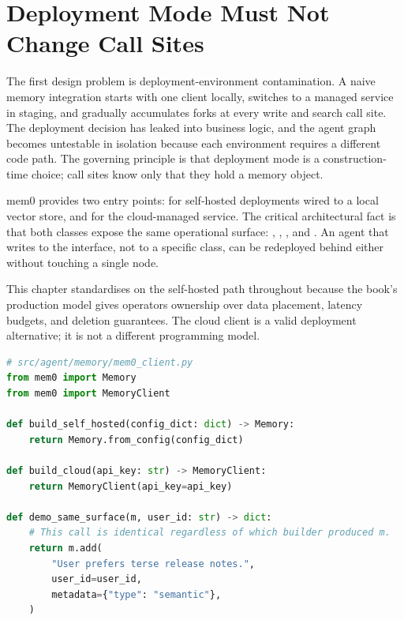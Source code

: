 \section{Deployment Mode Must Not Change Call Sites}
\label{sec:deployment-mode}

The first design problem is deployment-environment contamination. A naive memory
integration starts with one client locally, switches to a managed service in
staging, and gradually accumulates  forks at
every write and search call site. The deployment decision has leaked into
business logic, and the agent graph becomes untestable in isolation because
each environment requires a different code path. The governing principle is
that deployment mode is a construction-time choice; call sites know only
that they hold a memory object.

mem0 provides two entry points:  for
self-hosted deployments wired to a local vector store, and
 for the cloud-managed service. The
critical architectural fact is that both classes expose the same operational
surface: , , , and
. An agent that writes to the interface, not to a specific
class, can be redeployed behind either without touching a single node.

This chapter standardises on the self-hosted path throughout because the
book's production model gives operators ownership over data placement,
latency budgets, and deletion guarantees. The cloud client is a valid
deployment alternative; it is not a different programming model.

\begin{lstlisting}[language=Python,
  caption={Both deployment modes expose the same write surface},
  label={lst:mem0-interface}]
# src/agent/memory/mem0_client.py
from mem0 import Memory
from mem0 import MemoryClient

def build_self_hosted(config_dict: dict) -> Memory:
    return Memory.from_config(config_dict)

def build_cloud(api_key: str) -> MemoryClient:
    return MemoryClient(api_key=api_key)

def demo_same_surface(m, user_id: str) -> dict:
    # This call is identical regardless of which builder produced m.
    return m.add(
        "User prefers terse release notes.",
        user_id=user_id,
        metadata={"type": "semantic"},
    )
\end{lstlisting}

